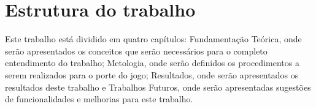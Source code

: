 \section*{Estrutura do trabalho}

Este trabalho está dividido em quatro capítulos: Fundamentação Teórica, onde serão apresentados os conceitos que serão necessários para o completo entendimento do trabalho; Metologia, onde serão definidos os procedimentos a serem realizados para o porte do jogo; Resultados, onde serão apresentados os resultados deste trabalho e Trabalhos Futuros, onde serão apresentadas sugestões de funcionalidades e melhorias para este trabalho.